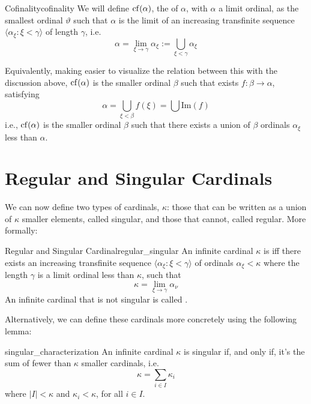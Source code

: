 \begin{definition}{Cofinality}{cofinality}
    We will define $\mathrm{cf}\!\left(\alpha\right)$, the  of $\alpha$, with $\alpha$ a limit ordinal, as the smallest ordinal $\vartheta$ such that $\alpha$ is the limit of an increasing transfinite sequence $\langle\alpha_\xi:\xi<\gamma\rangle$ of length $\gamma$, i.e.
    $$\alpha=\lim_{\xi\to\gamma}\alpha_\xi:=\bigcup_{\xi<\gamma}\alpha_\xi$$
\end{definition}

Equivalently, making easier to visualize the relation between this with the discussion above, $\mathrm{cf}\!\left(\alpha\right)$ is the smaller ordinal $\beta$ such that exists $f:\beta\to\alpha$, satisfying
$$\alpha=\bigcup_{\xi<\beta}f(\xi)=\bigcup\mathrm{Im}(f)$$
i.e., $\mathrm{cf}\!\left(\alpha\right)$ is the smaller ordinal $\beta$ such that there exists a union of $\beta$ ordinals $\alpha_\xi$ less than $\alpha$.

\section{Regular and Singular Cardinals}

We can now define two types of cardinals, $\kappa$: those that can be written as a union of $\kappa$ smaller elements, called singular, and those that cannot, called regular. More formally:

\begin{definition}{Regular and Singular Cardinal}{regular_singular}
    An infinite cardinal $\kappa$ is  iff there exists an increasing transfinite sequence $\langle\alpha_\xi:\xi<\gamma\rangle$ of ordinals $\alpha_\xi<\kappa$ where the length $\gamma$ is a limit ordinal less than $\kappa$, such that
    $$\kappa=\lim_{\xi\to\gamma}\alpha_\nu$$
    An infinite cardinal that is not singular is called .
\end{definition}

Alternatively, we can define these cardinals more concretely using the following lemma:

\begin{lemma}{}{singular_characterization}
    An infinite cardinal $\kappa$ is singular if, and only if, it's the sum of fewer than $\kappa$ smaller cardinals, i.e.
    $$\kappa=\sum_{i\in I}\kappa_i$$
    where $|I|<\kappa$ and $\kappa_i<\kappa$, for all $i\in I$.
\end{lemma}

